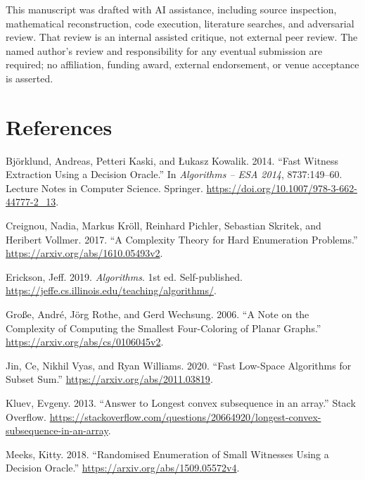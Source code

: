 \documentclass[
  11pt,
  letterpaper,
]{article}
\newlength{\cslhangindent}
\newlength{\cslentryspacingunit} %
\newenvironment{CSLReferences}[2] %
 {%
  \setlength{\parindent}{0pt}
  \ifodd #1
  \let\oldpar\par
  \def\par{\hangindent=\cslhangindent\oldpar}
  \fi
  \setlength{\parskip}{#2\cslentryspacingunit}
 }%
 {}
\begin{document}
This manuscript was drafted with AI assistance, including source
inspection, mathematical reconstruction, code execution, literature
searches, and adversarial review. That review is an internal assisted
critique, not external peer review. The named author's review and
responsibility for any eventual submission are required; no affiliation,
funding award, external endorsement, or venue acceptance is asserted.

\hypertarget{references}{%
\section*{References}\label{references}}

\hypertarget{refs}{}
\begin{CSLReferences}{1}{0}
\leavevmode{}%
Björklund, Andreas, Petteri Kaski, and Łukasz Kowalik. 2014. {``Fast
Witness Extraction Using a Decision Oracle.''} In \emph{Algorithms --
ESA 2014}, 8737:149--60. Lecture Notes in Computer Science. Springer.
\url{https://doi.org/10.1007/978-3-662-44777-2_13}.

\leavevmode{}%
Creignou, Nadia, Markus Kröll, Reinhard Pichler, Sebastian Skritek, and
Heribert Vollmer. 2017. {``A Complexity Theory for Hard Enumeration
Problems.''} \url{https://arxiv.org/abs/1610.05493v2}.

\leavevmode{}%
Erickson, Jeff. 2019. \emph{Algorithms}. 1st ed. Self-published.
\url{https://jeffe.cs.illinois.edu/teaching/algorithms/}.

\leavevmode{}%
Große, André, Jörg Rothe, and Gerd Wechsung. 2006. {``A Note on the
Complexity of Computing the Smallest Four-Coloring of Planar Graphs.''}
\url{https://arxiv.org/abs/cs/0106045v2}.

\leavevmode{}%
Jin, Ce, Nikhil Vyas, and Ryan Williams. 2020. {``Fast Low-Space
Algorithms for Subset Sum.''} \url{https://arxiv.org/abs/2011.03819}.

\leavevmode{}%
Kluev, Evgeny. 2013. {``Answer to {Longest convex subsequence in an
array}.''} Stack Overflow.
\url{https://stackoverflow.com/questions/20664920/longest-convex-subsequence-in-an-array}.

\leavevmode{}%
Meeks, Kitty. 2018. {``Randomised Enumeration of Small Witnesses Using a
Decision Oracle.''} \url{https://arxiv.org/abs/1509.05572v4}.


\end{CSLReferences}
\end{document}
